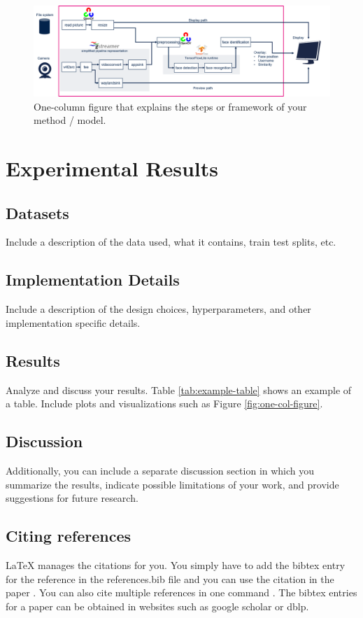 \documentclass{article}
\begin{document}
\begin{figure}
    \centering
    \includegraphics[width=\linewidth]{figures/example_pipeline.png}
    \caption{One-column figure that explains the steps or framework of your method / model.}
    \label{fig:two-col-figure}
\end{figure}

\section{Experimental Results}
\subsection{Datasets}
Include a description of the data used, what it contains, train test splits, etc.
\subsection{Implementation Details}
Include a description of the design choices, hyperparameters, and other implementation specific details.

\subsection{Results}
Analyze and discuss your results. Table \ref{tab:example-table} shows an example of a table.
Include plots and visualizations such as Figure \ref{fig:one-col-figure}.

\subsection{Discussion}
Additionally, you can include a separate discussion section in which you summarize the results, indicate possible limitations of your work, and provide suggestions for future research.

\subsection{Citing references}
LaTeX manages the citations for you. You simply have to add the bibtex entry for the reference in the references.bib file and you can use the citation in the paper \cite{langley00}. You can also cite multiple references in one command \cite{DudaHart2nd,Newell81,kearns89}. The bibtex entries for a paper can be obtained in websites such as google scholar or dblp.
\end{document}
